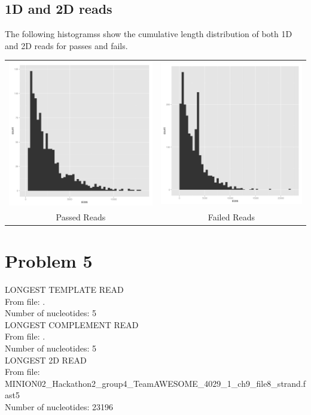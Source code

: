 \documentclass[11pt]{article}
\begin{document}
        
\subsection*{1D and 2D reads}

        The following histogramss show the cumulative length distribution of both 1D and 2D reads for passes and fails.

        
        \begin{tabular}{cc}
          \includegraphics[width=.48\textwidth]{histallpass}
          &
          \includegraphics[width=.48\textwidth]{histallfail}
          \\
          Passed Reads
          &
          Failed Reads
        \end{tabular}
\section*{Problem 5}

LONGEST TEMPLATE READ\\
From file: .\\
Number of nucleotides: 5\\

LONGEST COMPLEMENT READ\\
From file: .\\
Number of nucleotides: 5\\

LONGEST 2D READ\\
From file: MINION02\_Hackathon2\_group4\_TeamAWESOME\_4029\_1\_ch9\_file8\_strand.fast5\\
Number of nucleotides: 23196\\
\end{document}
